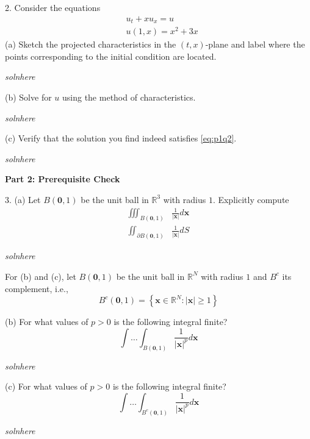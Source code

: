 \documentclass{article}
\begin{document}
2. Consider the equations
%
\begin{equation}
    \begin{aligned}
        &u_{t} + x u_{x} = u \\
        &u(1, x) = x^2 + 3 x
    \end{aligned}
    \label{eq:p1q2}
\end{equation}
%
(a) Sketch the projected characteristics in the $(t, x)$-plane and label
where the points corresponding to the initial condition are located.

\quad \textit{solnhere}

(b) Solve for $u$ using the method of characteristics.

\quad \textit{solnhere}

(c) Verify that the solution you find indeed satisfies \eqref{eq:p1q2}.

\quad \textit{solnhere}

\textbf{Part 2: Prerequisite Check}

3. (a) Let $B(\mathbf{0},1)$ be the unit ball in $\mathbb{R}^{3}$ with
   radius $1$. Explicitly compute
%
\begin{align}
    \iiint_{B(\mathbf{0},1)} &\frac{1}{|\mathbf{x}|} d \mathbf{x}
    \label{eq:p2q3a1} \\
    \iint_{\partial B(\mathbf{0},1)} &\frac{1}{|\mathbf{x}|} d S
    \label{eq:p2q3a2}
\end{align}

\quad \textit{solnhere}

For (b) and (c), let $B(\mathbf{0},1)$ be the unit ball in
$\mathbb{R}^{N}$ with radius $1$ and $B^{c}$ its complement, i.e.,
$$B^{c}(\mathbf{0}, 1) = \left\{\mathbf{x} \in \mathbb{R}^{N}: |\mathbf{x}| \geq 1 \right\}$$

(b) For what values of $p > 0$ is the following integral finite?
\begin{equation}
    \int \ldots \int_{B(\mathbf{0}, 1)} \frac{1}{|\mathbf{x}|^{p}} d \mathbf{x}
    \label{eq:p2q3b}
\end{equation}

\quad \textit{solnhere}

(c) For what values of $p > 0$ is the following integral finite?
\begin{equation}
    \int \ldots \int_{B^{c}(\mathbf{0}, 1)} \frac{1}{|\mathbf{x}|^{p}} d \mathbf{x}
    \label{eq:p2q3c}
\end{equation}

\quad \textit{solnhere}
\end{document}
